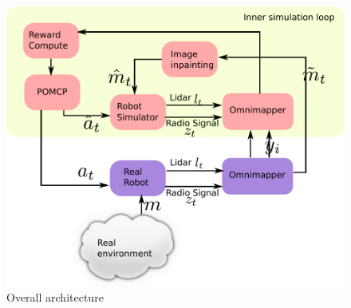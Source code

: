 %
\begin{figure}%
  \includegraphics[width=\columnwidth]{files/media/overall-architecture.pdf}
  \caption{Overall architecture}%
  \label{fig:architecture}%
\end{figure}%
% 
